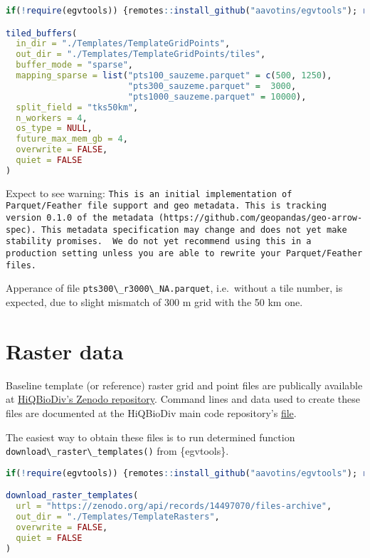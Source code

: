 \documentclass[
]{book}
\newcommand{\passthrough}[1]{#1}
\begin{document}
\begin{lstlisting}[language=R]
if(!require(egvtools)) {remotes::install_github("aavotins/egvtools"); require(egvtools)}

tiled_buffers(
  in_dir = "./Templates/TemplateGridPoints",
  out_dir = "./Templates/TemplateGridPoints/tiles",
  buffer_mode = "sparse",
  mapping_sparse = list("pts100_sauzeme.parquet" = c(500, 1250), 
                        "pts300_sauzeme.parquet" =  3000, 
                        "pts1000_sauzeme.parquet" = 10000),
  split_field = "tks50km",
  n_workers = 4,
  os_type = NULL,
  future_max_mem_gb = 4,
  overwrite = FALSE,
  quiet = FALSE
)
\end{lstlisting}

Expect to see warning:
\passthrough{\lstinline!This is an initial implementation of Parquet/Feather file support and geo metadata. This is tracking version 0.1.0 of the metadata (https://github.com/geopandas/geo-arrow-spec). This metadata specification may change and does not yet make stability promises.  We do not yet recommend using this in a production setting unless you are able to rewrite your Parquet/Feather files.!}

Apperance of file \passthrough{\lstinline!pts300\_r3000\_NA.parquet!}, i.e.~without a tile number, is expected,
due to slight mismatch of 300 m grid with the 50 km one.

\section{Raster data}\label{Ch03.02}

Baseline template (or reference) raster grid and point files are publically available
at \href{https://zenodo.org/records/14497070}{HiQBioDiv's Zenodo repository}. Command lines
and data used to create these files are documented at
the HiQBioDiv main code repository's \href{https://github.com/aavotins/HiQBioDiv/blob/main/Templates/TemplateGrids_Raster.R}{file}.

The easiest way to obtain these files is to run determined
function \passthrough{\lstinline!download\_raster\_templates()!} from \{egvtools\}.

\begin{lstlisting}[language=R]
if(!require(egvtools)) {remotes::install_github("aavotins/egvtools"); require(egvtools)}

download_raster_templates(
  url = "https://zenodo.org/api/records/14497070/files-archive",
  out_dir = "./Templates/TemplateRasters",
  overwrite = FALSE,
  quiet = FALSE
)
\end{lstlisting}
\end{document}
